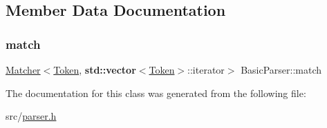 \subsection{Member Data Documentation}
\mbox{\label{class_basic_parser_afab2b9cbb6c9ef06d3e15054089ea6d9}} 
\subsubsection{\texorpdfstring{match}{match}}
{\footnotesize\ttfamily \hyperlink{class_matcher}{Matcher}$<$\hyperlink{class_token}{Token}, \textbf{ std\+::vector}$<$\hyperlink{class_token}{Token}$>$\+::iterator$>$ Basic\+Parser\+::match\hspace{0.3cm}{\ttfamily [protected]}}



The documentation for this class was generated from the following file\+:\begin{DoxyCompactItemize}
\item 
src/\hyperlink{parser_8h}{parser.\+h}\end{DoxyCompactItemize}
